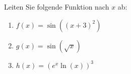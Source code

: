 \item Leiten Sie folgende Funktion nach $x$ ab:
\begin{enumerate}
\item $f(x) = \sin((x+3)^2)$
\item $g(x) = \sin(\sqrt x)$
\item $h(x) = (e^x \ln(x))^3$
\end{enumerate}

